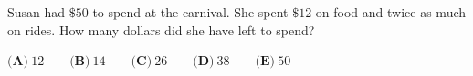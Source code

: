 Susan had $\$50$ to spend at the carnival. She spent $\$12$ on food and twice as much on rides. How many dollars did she have left to spend?



$\textbf{(A)}\ 12 \qquad
\textbf{(B)}\ 14 \qquad
\textbf{(C)}\ 26 \qquad
\textbf{(D)}\ 38 \qquad
\textbf{(E)}\ 50 $
